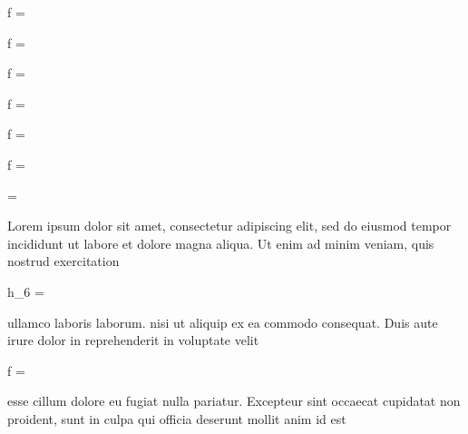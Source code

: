 \documentclass{article}
\begin{document}
\begin{form}
	f = 
\end{form}

\begin{form}
	f =  
\end{form}

\begin{form}
	f =   
\end{form}
%
	
\begin{form}
f = 
\end{form}
	
\begin{form}
	f = 
\end{form}
	
\begin{form}
f = 
\end{form}

\begin{form}
\end{form}

\begin{form}
\end{form}
%

\begin{form}
\end{form}

\begin{form}
	 = 
\end{form}

Lorem ipsum dolor sit amet, consectetur adipiscing elit, sed do eiusmod tempor incididunt ut labore et dolore magna 
aliqua. Ut enim ad minim veniam, quis nostrud exercitation \begin{forminline}
	h_6 = 
\end{forminline} ullamco laboris laborum. nisi ut aliquip ex ea commodo consequat. Duis aute irure dolor in 
reprehenderit in voluptate velit \begin{forminline}
	f = 
\end{forminline} esse cillum dolore eu fugiat nulla pariatur. Excepteur sint occaecat cupidatat non 
proident, sunt in culpa qui officia deserunt mollit anim id est
\end{document}
